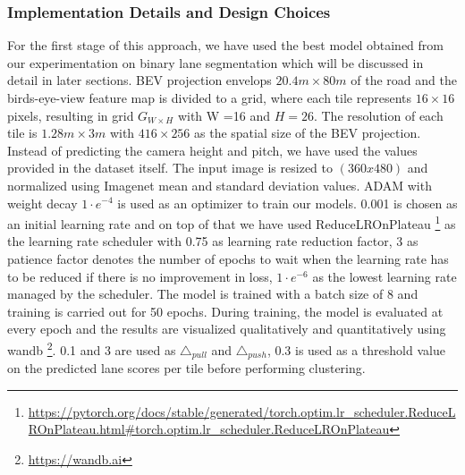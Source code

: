         \subsubsection{Implementation Details and Design Choices }
        For the first stage of this approach, we have used the best model obtained from our experimentation on binary lane segmentation which will be discussed in detail in later sections. BEV projection envelops $20.4m \times 80m$ of the road and the birds-eye-view feature map is divided to a grid, where each tile represents $16 \times 16$ pixels, resulting in grid $G_{W \times H}$ with W =16 and $H =26$. The resolution of each tile is $1.28m \times 3m$ with $416 \times 256$ as the spatial size of the BEV projection. Instead of predicting the camera height and pitch, we have used the values provided in the dataset itself.  The input image is
        resized to $(360x480)$ and normalized using Imagenet\cite{deng2009imagenet} mean and standard deviation values. ADAM with weight decay $1 \cdot e^{-4}$ is used as an optimizer to train our models. 0.001 is chosen as an initial learning rate and on top of that we have used ReduceLROnPlateau \footnote{\url{https://pytorch.org/docs/stable/generated/torch.optim.lr_scheduler.ReduceLROnPlateau.html#torch.optim.lr_scheduler.ReduceLROnPlateau}} as the learning rate scheduler with 0.75 as learning rate reduction factor, 3 as patience factor denotes the number of epochs to wait when the learning rate has to be reduced if there is no improvement in loss, $1 \cdot e^{-6}$ as the lowest learning rate managed by the scheduler. The model is trained with a batch size of 8 and training is carried out for 50 epochs. During training, the model is evaluated at every epoch and the results are visualized qualitatively and quantitatively using wandb \footnote{\url{https://wandb.ai}}. 0.1 and 3 are used as $\triangle_{pull}$ and $\triangle_{push}$, 0.3 is used as a threshold value on the predicted lane scores per tile before performing clustering.
        


